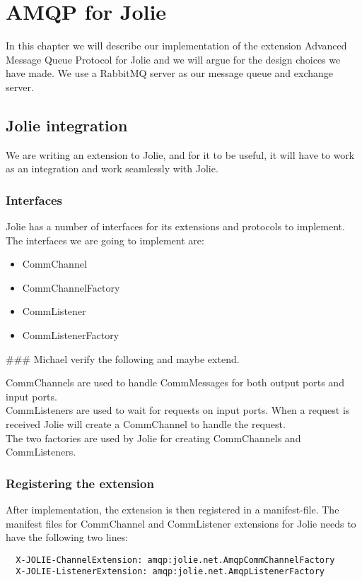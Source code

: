 \section{AMQP for Jolie}
In this chapter we will describe our implementation of the extension Advanced Message Queue Protocol for Jolie and we will argue for the design choices we have made. We use a RabbitMQ\cite{RabbitMQ} server as our message queue and exchange server.

\subsection{Jolie integration}
We are writing an extension to Jolie, and for it to be useful, it will have to work as an integration and work seamlessly with Jolie.

\subsubsection{Interfaces}
Jolie has a number of interfaces for its extensions and protocols to implement. The interfaces we are going to implement are:
\begin{itemize}
\item CommChannel
\item CommChannelFactory
\item CommListener
\item CommListenerFactory
\end{itemize}

\#\#\# Michael verify the following and maybe extend.

CommChannels are used to handle CommMessages for both output ports and input ports.\\
CommListeners are used to wait for requests on input ports. When a request is received Jolie will create a CommChannel to handle the request.\\
The two factories are used by Jolie for creating CommChannels and CommListeners.

\subsubsection{Registering the extension}
After implementation, the extension is then registered in a manifest-file. The manifest files for CommChannel and CommListener extensions for Jolie needs to have the following two lines:
\begin{lstlisting}
  X-JOLIE-ChannelExtension: amqp:jolie.net.AmqpCommChannelFactory
  X-JOLIE-ListenerExtension: amqp:jolie.net.AmqpListenerFactory
\end{lstlisting}

